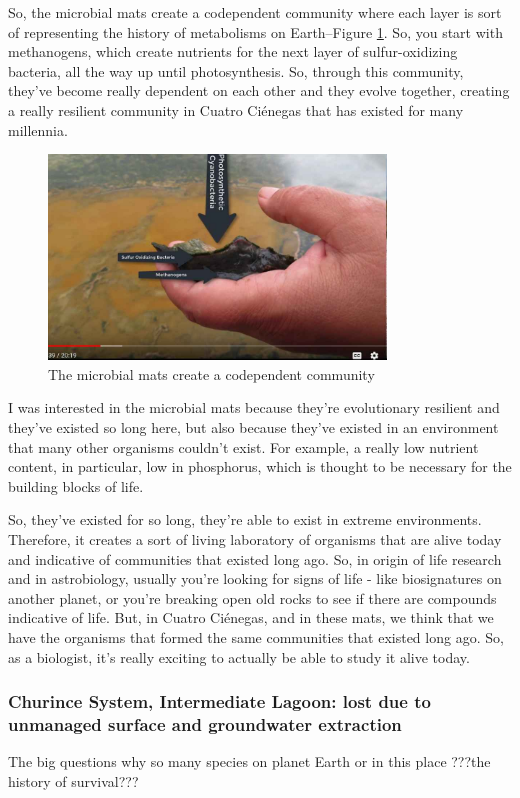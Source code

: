 \documentclass[]{article}
\begin{document}
So, the microbial mats create a codependent community where each layer is sort of representing the history of metabolisms on Earth--Figure \ref{fig:MicrobialMatDetail}. So, you start with methanogens, 
which create nutrients for the next layer of sulfur-oxidizing bacteria, all the way up until photosynthesis. So, through this community, they've become really dependent on each other and they evolve together, creating a really resilient community in Cuatro  Ci\'enegas that has existed for many millennia.

\begin{figure}[H]
	\caption{The microbial mats create a codependent community}\label{fig:MicrobialMatDetail}
	\includegraphics[width=0.8\textwidth]{MicrobialMatDetail}
\end{figure}

I was interested in the microbial mats because they're evolutionary resilient
and they've existed so long here, but also because they've existed in an environment that many other organisms couldn't exist. For example, a really low nutrient content, in particular, low in phosphorus, which is thought to be necessary for the building blocks of life.

So, they've existed for so long, they're able to exist in extreme environments. Therefore, it creates a sort of living laboratory of organisms that are alive today and indicative of communities that existed long ago. So, in origin of life research and in astrobiology, usually you're looking for signs of life - like biosignatures on another planet, or you're breaking open old rocks to see if there are compounds indicative of life. But, in Cuatro  Ci\'enegas, and in these mats, we think that we have the organisms that formed the same communities that existed long ago.  So, as a biologist, it's really exciting to actually be able to study it alive today.

\subsubsection{Churince System, Intermediate Lagoon: lost due to unmanaged surface and groundwater extraction}
The big questions why so many species on planet Earth or in this place
???the history of survival???
\end{document}
